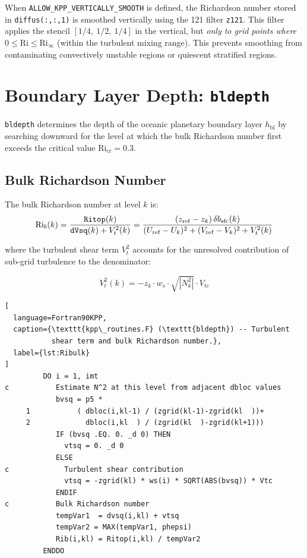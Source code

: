 \documentclass[12pt,letterpaper]{article}
\newcommand{\hbl}{h_{\mathrm{bl}}}
\newcommand{\Ri}{\mathrm{Ri}}
\newcommand{\Ricr}{\mathrm{Ri_{cr}}}
\begin{document}
When \texttt{ALLOW\_KPP\_VERTICALLY\_SMOOTH} is defined, the Richardson  
number stored in \texttt{diffus(:,:,1)} is smoothed vertically using  
the 121 filter \texttt{z121}. This filter applies the stencil  
$[1/4,\ 1/2,\ 1/4]$ in the vertical, but \textit{only to grid points  
where $0 \leq \Ri \leq \Ri_\infty$} (within the turbulent mixing range).  
This prevents smoothing from contaminating convectively unstable regions  
or quiescent stratified regions.  
  
\section{Boundary Layer Depth: \texttt{bldepth}}  
  
\texttt{bldepth} determines the depth of the oceanic planetary boundary  
layer $\hbl$ by searching downward for the level at which the bulk  
Richardson number first exceeds the critical value $\Ricr = 0.3$.  
  
\subsection{Bulk Richardson Number}  
  
The bulk Richardson number at level $k$ is:  
\begin{equation}  
\Ri_b(k) = \frac{\texttt{Ritop}(k)}{\texttt{dVsq}(k) + V_t^2(k)}  
= \frac{(z_{\rm ref} - z_k)\,\delta b_{\rm sfc}(k)}  
  {(U_{\rm ref} - U_k)^2 + (V_{\rm ref} - V_k)^2 + V_t^2(k)}  
\end{equation}  
  
where the turbulent shear term $V_t^2$ accounts for the unresolved  
contribution of sub-grid turbulence to the denominator:  
  
\begin{equation}  
V_t^2(k) = -z_k \cdot w_s \cdot \sqrt{|N_k^2|} \cdot V_{tc}  
\end{equation}  
  
\begin{lstlisting}[  
  language=Fortran90KPP,  
  caption={\texttt{kpp\_routines.F} (\texttt{bldepth}) -- Turbulent  
           shear term and bulk Richardson number.},  
  label={lst:Ribulk}  
]  
         DO i = 1, imt  
c           Estimate N^2 at this level from adjacent dbloc values  
            bvsq = p5 *  
     1           ( dbloc(i,kl-1) / (zgrid(kl-1)-zgrid(kl  ))+  
     2             dbloc(i,kl  ) / (zgrid(kl  )-zgrid(kl+1)))  
            IF (bvsq .EQ. 0. _d 0) THEN  
              vtsq = 0. _d 0  
            ELSE  
c             Turbulent shear contribution  
              vtsq = -zgrid(kl) * ws(i) * SQRT(ABS(bvsq)) * Vtc  
            ENDIF  
c           Bulk Richardson number  
            tempVar1  = dvsq(i,kl) + vtsq  
            tempVar2 = MAX(tempVar1, phepsi)  
            Rib(i,kl) = Ritop(i,kl) / tempVar2  
         ENDDO  
\end{lstlisting}  
  
\end{document}

